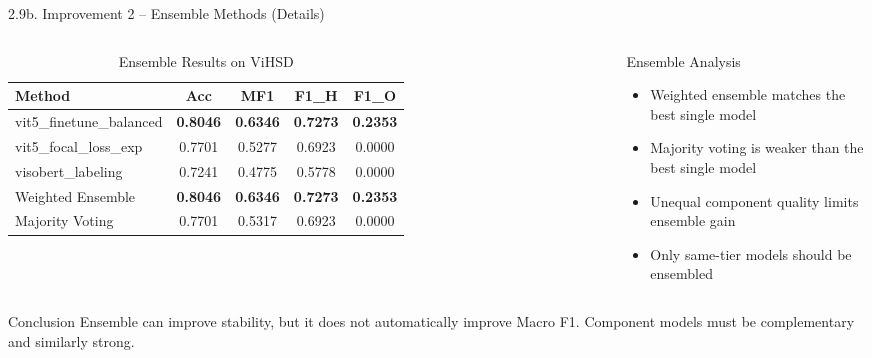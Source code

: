 \documentclass[11pt, aspectratio=169]{beamer}
\begin{document}
\begin{frame}[shrink=8]{2.9b. Improvement 2 -- Ensemble Methods (Details)}

\begin{columns}[T]
  \begin{table}[h]
    \centering
    \caption{Ensemble Results on ViHSD}
    \vspace{0.1cm}
    \scriptsize
    \begin{tabular}{lcccc}
      \toprule
      \textbf{Method} & \textbf{Acc} & \textbf{MF1} & \textbf{F1\_H} & \textbf{F1\_O} \\
      \midrule
      vit5\_finetune\_balanced & \textbf{0.8046} & \textbf{0.6346} & \textbf{0.7273} & \textbf{0.2353} \\
      vit5\_focal\_loss\_exp & 0.7701 & 0.5277 & 0.6923 & 0.0000 \\
      visobert\_labeling & 0.7241 & 0.4775 & 0.5778 & 0.0000 \\
      \midrule
      Weighted Ensemble & \textbf{0.8046} & \textbf{0.6346} & \textbf{0.7273} & \textbf{0.2353} \\
      Majority Voting & 0.7701 & 0.5317 & 0.6923 & 0.0000 \\
      \bottomrule
    \end{tabular}
  \end{table}

  \begin{block}{Ensemble Analysis}
    \begin{itemize}
      \item Weighted ensemble matches the best single model
      \item Majority voting is weaker than the best single model
      \item Unequal component quality limits ensemble gain
      \item Only same-tier models should be ensembled
    \end{itemize}
  \end{block}
\end{columns}

\vspace{0.2cm}
\begin{block}{Conclusion}
  Ensemble can improve stability, but it does not automatically improve Macro F1. Component models must be complementary and similarly strong.
\end{block}
\end{frame}
\end{document}
